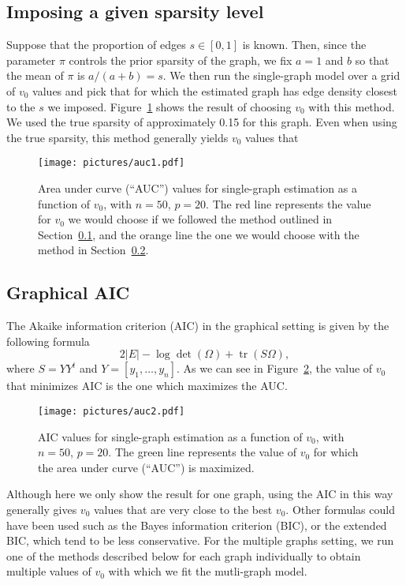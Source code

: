 \documentclass[a4paper, 11pt, oneside]{report}
\DeclareMathOperator{\tr}{tr}
\newcommand{\1}{\mathds{1}}
\begin{document}
\subsection{Imposing a given sparsity level}\label{sect:imposing-sparsity}
Suppose that the proportion of edges $s \in [0,1]$ is known.
Then, since the parameter $\pi$ controls the prior sparsity of the graph, we
fix $a = 1$ and $b$ so that the mean of $\pi$ is $a / (a+b) = s$.
We then run the single-graph model over a grid of $v_0$ values and pick that
for which the estimated graph has edge density closest to the $s$ we imposed.
Figure~\ref{fig:auc} shows the result of choosing $v_0$ with this method.
We used the true sparsity of approximately 0.15 for this graph.
Even when using the true sparsity, this method generally yields $v_0$ values
that
\begin{figure}[tb]
	\begin{center}
		\texttt{[image: pictures/auc1.pdf]}
	\end{center}
	\caption{Area under curve (``AUC'') values for single-graph estimation as a function of $v_0$, with $n=50$, $p=20$.
		The red line represents the value for $v_0$ we would choose if we followed the method outlined in Section~\ref{sect:imposing-sparsity},
		and the orange line the one we would choose with the method in Section~\ref{sect:graphical-aic}.
	}
	\label{fig:auc}
\end{figure}

\subsection{Graphical AIC}\label{sect:graphical-aic}
The Akaike information criterion (AIC) in the graphical setting is given by the following formula
\[2|E| - \log\det(\Omega) + \tr(S \Omega),\]
where $S = YY^t$ and $Y = [y_1, \dots, y_n]$.
As we can see in Figure~\ref{fig:aic}, the value of $v_0$ that minimizes AIC is the one which maximizes the AUC.
\begin{figure}[tb]
	\begin{center}
		\texttt{[image: pictures/auc2.pdf]}
	\end{center}
	\caption{AIC values for single-graph estimation as a function of $v_0$, with $n=50$, $p=20$.
		The green line represents the value of $v_0$ for which the area under curve (``AUC'') is maximized.
	}
	\label{fig:aic}
\end{figure}
Although here we only show the result for one graph, using the AIC in this way generally gives
$v_0$ values that are very close to the best $v_0$.
Other formulas could have been used such as the Bayes information criterion (BIC), or the
extended BIC, which tend to be less conservative.
For the multiple graphs setting, we run one of the methods described below for each graph individually
to obtain multiple values of $v_0$ with which we fit the mutli-graph model.
\end{document}
